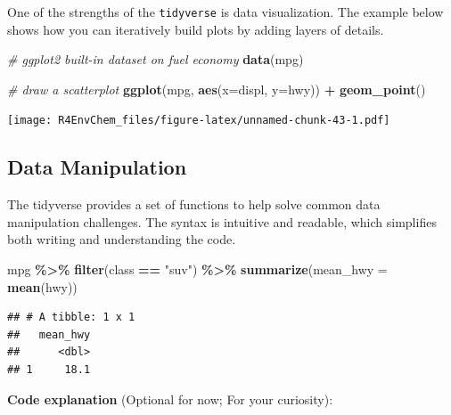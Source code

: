 \documentclass[
]{book}
\newenvironment{Shaded}{\begin{snugshade}}{\end{snugshade}}
\newcommand{\AttributeTok}[1]{\textcolor[rgb]{0.13,0.29,0.53}{#1}}
\newcommand{\CommentTok}[1]{\textcolor[rgb]{0.56,0.35,0.01}{\textit{#1}}}
\newcommand{\FunctionTok}[1]{\textcolor[rgb]{0.13,0.29,0.53}{\textbf{#1}}}
\newcommand{\NormalTok}[1]{#1}
\newcommand{\SpecialCharTok}[1]{\textcolor[rgb]{0.81,0.36,0.00}{\textbf{#1}}}
\newcommand{\StringTok}[1]{\textcolor[rgb]{0.31,0.60,0.02}{#1}}
\begin{document}
One of the strengths of the \texttt{tidyverse} is data visualization. The example below shows how you can iteratively build plots by adding layers of details.

\begin{Shaded}
\begin{Highlighting}[]
\CommentTok{\# ggplot2 built{-}in dataset on fuel economy}
\FunctionTok{data}\NormalTok{(mpg)}

\CommentTok{\# draw a scatterplot}
\FunctionTok{ggplot}\NormalTok{(mpg, }\FunctionTok{aes}\NormalTok{(}\AttributeTok{x=}\NormalTok{displ, }\AttributeTok{y=}\NormalTok{hwy)) }\SpecialCharTok{+} \FunctionTok{geom\_point}\NormalTok{()}
\end{Highlighting}
\end{Shaded}

\texttt{[image: R4EnvChem\_files/figure-latex/unnamed-chunk-43-1.pdf]}

\hypertarget{data-manipulation}{%
\subsection{Data Manipulation}\label{data-manipulation}}

The tidyverse provides a set of functions to help solve common data manipulation challenges. The syntax is intuitive and readable, which simplifies both writing and understanding the code.

\begin{Shaded}
\begin{Highlighting}[]
\NormalTok{mpg }\SpecialCharTok{\%\textgreater{}\%}
  \FunctionTok{filter}\NormalTok{(class }\SpecialCharTok{==} \StringTok{"suv"}\NormalTok{) }\SpecialCharTok{\%\textgreater{}\%}
  \FunctionTok{summarize}\NormalTok{(}\AttributeTok{mean\_hwy =} \FunctionTok{mean}\NormalTok{(hwy))}
\end{Highlighting}
\end{Shaded}

\begin{verbatim}
## # A tibble: 1 x 1
##   mean_hwy
##      <dbl>
## 1     18.1
\end{verbatim}

\textbf{Code explanation} (Optional for now; For your curiosity):
\end{document}
